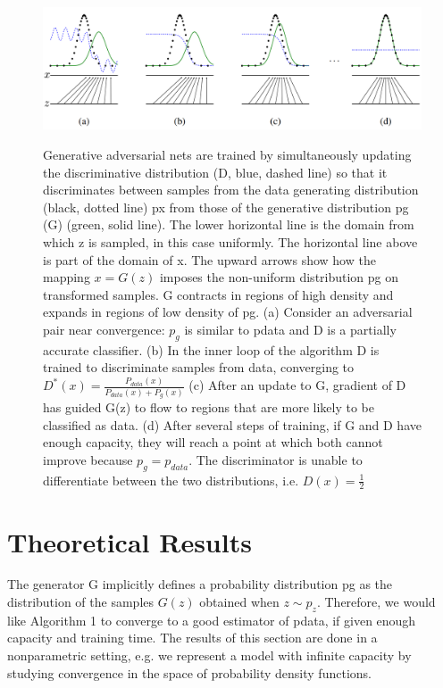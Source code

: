 \documentclass{article}
\begin{document}
\begin{figure}[h]
    \centering
    \includegraphics[width=\textwidth]{figure/fig1.PNG}
    \label{fig:fig1}
    \caption{Generative adversarial nets are trained by simultaneously updating the discriminative distribution
(D, blue, dashed line) so that it discriminates between samples from the data generating distribution (black,
dotted line) px from those of the generative distribution pg (G) (green, solid line). The lower horizontal line is
the domain from which z is sampled, in this case uniformly. The horizontal line above is part of the domain
of x. The upward arrows show how the mapping $x = G(z)$ imposes the non-uniform distribution pg on
transformed samples. G contracts in regions of high density and expands in regions of low density of pg. (a)
Consider an adversarial pair near convergence: $p_g$ is similar to pdata and D is a partially accurate classifier.
(b) In the inner loop of the algorithm D is trained to discriminate samples from data, converging to $D^*(x)= \frac{P_{data}(x)}{P_{data}(x)+P_{g}(x)}$  (c) After an update to G, gradient of D has guided G(z) to flow to regions that are more likely
to be classified as data. (d) After several steps of training, if G and D have enough capacity, they will reach a
point at which both cannot improve because $p_g = p_{data}$. The discriminator is unable to differentiate between
the two distributions, i.e. $D(x) = \frac{1}{2}$
}
\end{figure}

\section{Theoretical Results}

The generator G implicitly defines a probability distribution pg as the distribution of the samples
$G(z)$ obtained when $z \sim p_z$. Therefore, we would like Algorithm 1 to converge to a good estimator
of pdata, if given enough capacity and training time. The results of this section are done in a nonparametric
setting, e.g. we represent a model with infinite capacity by studying convergence in the
space of probability density functions.
\end{document}
